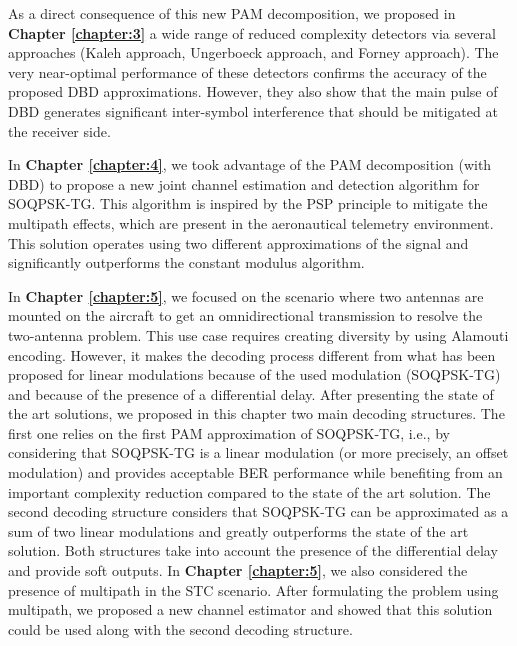 As a direct consequence of this new PAM decomposition, we proposed in \textbf{Chapter \ref{chapter:3}} a wide range of reduced complexity detectors via several approaches (Kaleh approach, Ungerboeck approach, and Forney approach). The very near-optimal performance of these detectors confirms the accuracy of the proposed DBD approximations. However, they also show that the main pulse of DBD generates significant inter-symbol interference that should be mitigated at the receiver side. 

In \textbf{Chapter \ref{chapter:4}}, we took advantage of the PAM decomposition (with DBD) to propose a new joint channel estimation and detection algorithm for SOQPSK-TG. This algorithm is inspired by the PSP principle to mitigate the multipath effects, which are present in the aeronautical telemetry environment. This solution operates using two different approximations of the signal and significantly outperforms the constant modulus algorithm. 

In \textbf{Chapter \ref{chapter:5}}, we focused on the scenario where two antennas are mounted on the aircraft to get an omnidirectional transmission to resolve the two-antenna problem. This use case requires creating diversity by using Alamouti encoding. However, it makes the decoding process different from what has been proposed for linear modulations because of the used modulation (SOQPSK-TG) and because of the presence of a differential delay. After presenting the state of the art solutions, we proposed in this chapter two main decoding structures. The first one relies on the first PAM approximation of SOQPSK-TG, i.e., by considering that SOQPSK-TG is a linear modulation (or more precisely, an offset modulation) and provides acceptable BER performance while benefiting from an important complexity reduction compared to the state of the art solution. The second decoding structure considers that SOQPSK-TG can be approximated as a sum of two linear modulations and greatly outperforms the state of the art solution. Both structures take into account the presence of the differential delay and provide soft outputs. 
In \textbf{Chapter \ref{chapter:5}}, we also considered the presence of multipath in the STC scenario. After formulating the problem using multipath, we proposed a new channel estimator and showed that this solution could be used along with the second decoding structure.

